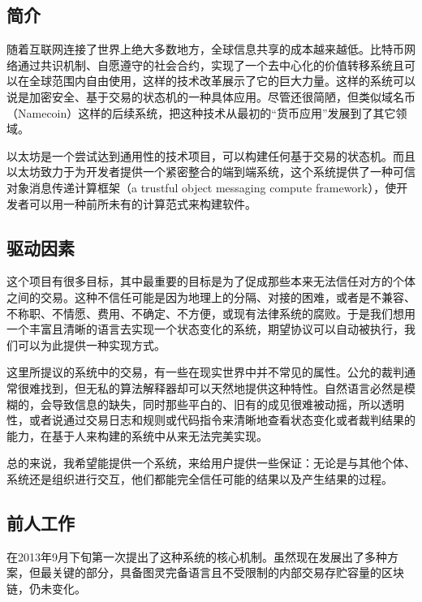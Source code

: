 \documentclass[9pt,oneside]{amsart}
\begin{document}
\setlength{\columnsep}{20pt}
\begin{multicols}{2}

\section{简介}\label{sec:introduction}

随着互联网连接了世界上绝大多数地方，全球信息共享的成本越来越低。比特币网络通过共识机制、自愿遵守的社会合约，实现了一个去中心化的价值转移系统且可以在全球范围内自由使用，这样的技术改革展示了它的巨大力量。这样的系统可以说是加密安全、基于交易的状态机的一种具体应用。尽管还很简陋，但类似域名币（Namecoin）这样的后续系统，把这种技术从最初的“货币应用”发展到了其它领域。

以太坊是一个尝试达到通用性的技术项目，可以构建任何基于交易的状态机。而且以太坊致力于为开发者提供一个紧密整合的端到端系统，这个系统提供了一种可信对象消息传递计算框架（a trustful object messaging compute framework），使开发者可以用一种前所未有的计算范式来构建软件。

\subsection{驱动因素} \label{ch:driving}

这个项目有很多目标，其中最重要的目标是为了促成那些本来无法信任对方的个体之间的交易。这种不信任可能是因为地理上的分隔、对接的困难，或者是不兼容、不称职、不情愿、费用、不确定、不方便，或现有法律系统的腐败。于是我们想用一个丰富且清晰的语言去实现一个状态变化的系统，期望协议可以自动被执行，我们可以为此提供一种实现方式。

这里所提议的系统中的交易，有一些在现实世界中并不常见的属性。公允的裁判通常很难找到，但无私的算法解释器却可以天然地提供这种特性。自然语言必然是模糊的，会导致信息的缺失，同时那些平白的、旧有的成见很难被动摇，所以透明性，或者说通过交易日志和规则或代码指令来清晰地查看状态变化或者裁判结果的能力，在基于人来构建的系统中从来无法完美实现。

总的来说，我希望能提供一个系统，来给用户提供一些保证：无论是与其他个体、系统还是组织进行交互，他们都能完全信任可能的结果以及产生结果的过程。

\subsection{前人工作} \label{ch:previous}

\cite{buterin2013ethereum} 在2013年9月下旬第一次提出了这种系统的核心机制。虽然现在发展出了多种方案，但最关键的部分，具备图灵完备语言且不受限制的内部交易存贮容量的区块链，仍未变化。


\end{multicols}
\end{document}
